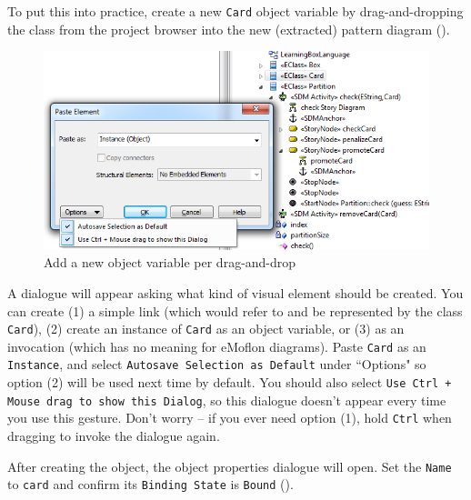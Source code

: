 \begin{stepbystep}
\item To put this into practice, create a new \texttt{Card} object variable by drag-and-dropping the class from the project browser
into the new (extracted) pattern diagram ().

\vspace{0.5cm}

\begin{figure}[htbp]
\begin{center}
  \includegraphics[width=\textwidth]{../../org.moflon.doc.handbook.03_storyDiagrams/04_checkCard/visCheImages/ea_dragDropDialogue}
  \caption{Add a new object variable per drag-and-drop}
  \label{ea:sdm_check_bound_card}
\end{center}
\end{figure}

\item A dialogue will appear asking what kind of visual element should be created. You can create (1) a simple link (which would refer to
and be represented by the class \texttt{Card}), (2) create an instance of \texttt{Card} as an object variable, or (3) as an invocation (which has no meaning
for eMoflon diagrams). Paste \texttt{Card} as an \texttt{Instance}, and select \texttt{Autosave Selection as Default} under ``Options" so option (2) will be
used next time by default. You should also select \texttt{Use Ctrl + Mouse drag to show this Dialog}, so this dialogue doesn't appear every time you use this
gesture. Don't worry -- if you ever need option (1), hold \texttt{Ctrl} when dragging to invoke the dialogue again.

\vspace{0.5cm}

\item After creating the object, the object properties dialogue will open.  Set the \texttt{Name} to \texttt{card} and confirm its
\texttt{Binding State} is \texttt{Bound} ().


\end{stepbystep}
